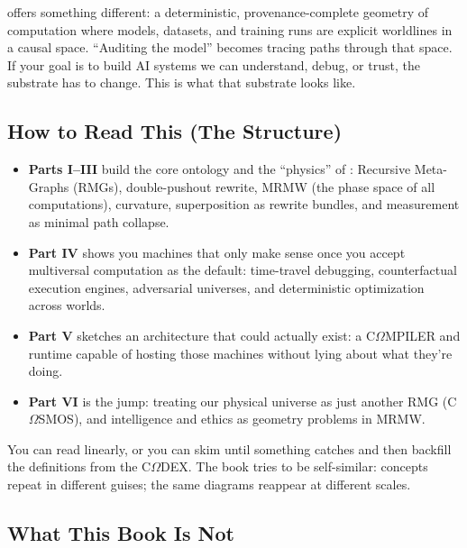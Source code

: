 \COMPUTER{} offers something different: a deterministic, provenance-complete geometry of computation where models, datasets, and training runs are explicit worldlines in a causal space. ``Auditing the model'' becomes tracing paths through that space. If your goal is to build AI systems we can understand, debug, or trust, the substrate has to change. This is what that substrate looks like.

\subsection*{How to Read This (The Structure)}

\begin{itemize}
  \item \textbf{Parts I--III} build the core ontology and the ``physics'' of \COMPUTER{}: Recursive Meta-Graphs (RMGs), double-pushout rewrite, MRMW (the phase space of all computations), curvature, superposition as rewrite bundles, and measurement as minimal path collapse.
  \item \textbf{Part IV} shows you machines that only make sense once you accept multiversal computation as the default: time-travel debugging, counterfactual execution engines, adversarial universes, and deterministic optimization across worlds.
  \item \textbf{Part V} sketches an architecture that could actually exist: a C$\Omega$MPILER and runtime capable of hosting those machines without lying about what they're doing.
  \item \textbf{Part VI} is the jump: treating our physical universe as just another RMG (C$\Omega$SMOS), and intelligence and ethics as geometry problems in MRMW.
\end{itemize}

\noindent
You can read linearly, or you can skim until something catches and then backfill the definitions from the C$\Omega$DEX. The book tries to be self-similar: concepts repeat in different guises; the same diagrams reappear at different scales.

\subsection*{What This Book Is Not}

